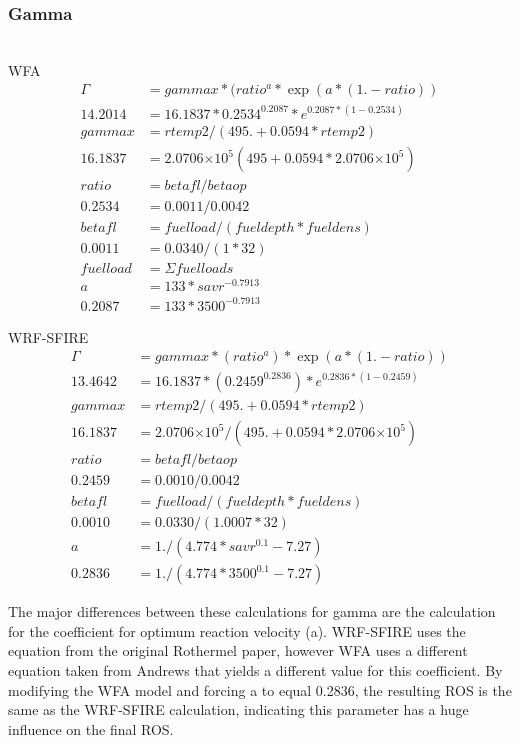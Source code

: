 \documentclass{article}
\newcommand\tenpow[1]{\ensuremath{{\times}10^{#1}}}
\begin{document}
\subsubsection{Gamma}

\\

WFA
\begin{equation}
	\label{gamma_WFA}
	\begin{split}
		\Gamma &= gammax*(ratio^a * \exp(a*(1.-ratio)) \\
		14.2014 &= 16.1837 * 0.2534 ^ {0.2087} * e^{0.2087 * (1 - 0.2534)} \\
		gammax &= rtemp2/(495. + 0.0594*rtemp2) \\
		16.1837 &= 2.0706\tenpow{5} (495 + 0.0594* 2.0706\tenpow{5}) \\
		ratio &= betafl/betaop \\
		0.2534 &= 0.0011 / 0.0042 \\
		betafl &= fuelload/(fueldepth * fueldens) \\
		0.0011 &= 0.0340 / (1 * 32) \\
		fuelload &= \Sigma fuelloads \\ 
	    a &= 133 * savr ^ {-0.7913} \\
		0.2087 &= 133 * 3500^{-0.7913} 
	\end{split}
\end{equation}


WRF-SFIRE
\begin{equation}
\label{gamma_WRF}
	\begin{split}
		\Gamma &= gammax*(ratio^a)*\exp(a*(1.-ratio)) \\
		13.4642 &= 16.1837 * (0.2459 ^ {0.2836}) * e^{0.2836 * (1- 0.2459)} \\
		gammax &= rtemp2/(495. + 0.0594*rtemp2) \\
		16.1837 &= 2.0706 \tenpow{5} / (495. + 0.0594* 2.0706 \tenpow{5}) \\
		ratio &= betafl / betaop \\
		0.2459 &= 0.0010 / 0.0042 \\
		betafl &= fuelload/(fueldepth * fueldens) \\
		0.0010 &= 0.0330 / (1.0007 * 32) \\
		a &= 1./(4.774 * savr^{0.1} - 7.27) \\
		0.2836 &= 1./(4.774 * 3500^{0.1} - 7.27)
	\end{split}
\end{equation}

The major differences between these calculations for gamma are the calculation for the coefficient for optimum reaction velocity (a). WRF-SFIRE uses the equation from the original Rothermel paper, however WFA uses a different equation taken from Andrews that yields a different value for this coefficient. By modifying the WFA model and forcing a to equal 0.2836, the resulting ROS is the same as the WRF-SFIRE calculation, indicating this parameter has a huge influence on the final ROS. 
\end{document}

